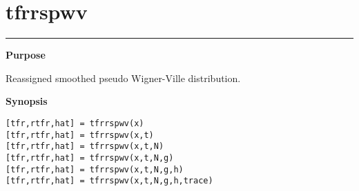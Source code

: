 

\section*{\hspace*{-1.6cm} tfrrspwv}

\vspace*{-.4cm}
\hspace*{-1.6cm}\rule[0in]{16.5cm}{.02cm}
\vspace*{.2cm}

{\bf \large \sf Purpose}\\
\hspace*{1.5cm}
\begin{minipage}[t]{13.5cm}
Reassigned smoothed pseudo Wigner-Ville distribution.
\end{minipage}
\vspace*{.5cm}

{\bf \large \sf Synopsis}\\
\hspace*{1.5cm}
\begin{minipage}[t]{13.5cm}
\begin{verbatim}
[tfr,rtfr,hat] = tfrrspwv(x) 
[tfr,rtfr,hat] = tfrrspwv(x,t) 
[tfr,rtfr,hat] = tfrrspwv(x,t,N) 
[tfr,rtfr,hat] = tfrrspwv(x,t,N,g) 
[tfr,rtfr,hat] = tfrrspwv(x,t,N,g,h) 
[tfr,rtfr,hat] = tfrrspwv(x,t,N,g,h,trace) 
\end{verbatim}
\end{minipage}
\vspace*{.5cm}

